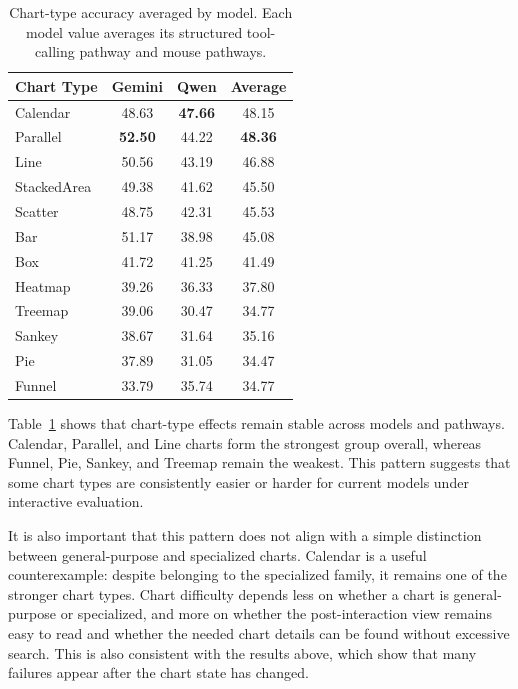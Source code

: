\documentclass[review,journal,hideappendix]{vgtc} %
\begin{document}
\begin{table}[t]
	\centering
	\caption{
		Chart-type accuracy averaged by model. Each model value averages its structured tool-calling pathway and mouse pathways.
	}
	\label{tab:chart_family_patterns}
	\begin{tabular}{lccc}
		\toprule
		Chart Type  & Gemini         & Qwen             & Average        \\
		\midrule 
		Calendar    & 48.63          & \textbf{47.66}   & 48.15          \\
		Parallel    & \textbf{52.50} & 44.22            & \textbf{48.36} \\
		Line        & 50.56          & 43.19            & 46.88          \\
		StackedArea & 49.38          & 41.62            & 45.50          \\
		Scatter     & 48.75          & 42.31            & 45.53          \\
		Bar         & 51.17          & 38.98            & 45.08          \\
		Box         & 41.72          & 41.25            & 41.49          \\
		Heatmap     & 39.26          & 36.33            & 37.80          \\
		Treemap     & 39.06          & 30.47            & 34.77          \\
		Sankey      & 38.67          & 31.64            & 35.16          \\
		Pie         & 37.89          & 31.05            & 34.47          \\
		Funnel      & 33.79          & 35.74            & 34.77          \\
		\bottomrule
	\end{tabular}
\end{table}

Table~\ref{tab:chart_family_patterns} shows that chart-type effects remain stable across models and pathways. Calendar, Parallel, and Line charts form the strongest group overall, whereas Funnel, Pie, Sankey, and Treemap remain the weakest. This pattern suggests that some chart types are consistently easier or harder for current models under interactive evaluation.

It is also important that this pattern does not align with a simple distinction between general-purpose and specialized charts. Calendar is a useful counterexample: despite belonging to the specialized family, it remains one of the stronger chart types. Chart difficulty depends less on whether a chart is general-purpose or specialized, and more on whether the post-interaction view remains easy to read and whether the needed chart details can be found without excessive search. This is also consistent with the results above, which show that many failures appear after the chart state has changed.
\end{document}
